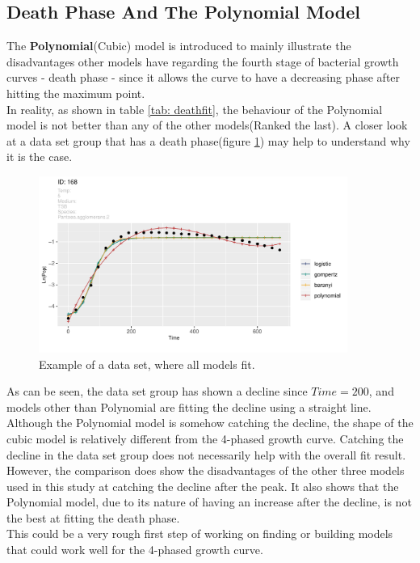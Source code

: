 \documentclass[11pt]{article}
\begin{document}
\subsection{Death Phase And The Polynomial Model}
The \textbf{Polynomial}(Cubic) model is introduced to mainly illustrate the disadvantages other models have regarding the fourth stage of bacterial growth curves - death phase - since it allows the curve to have a decreasing phase after hitting the maximum point.\\
In reality, as shown in table \ref{tab: deathfit}, the behaviour of the Polynomial model is not better than any of the other models(Ranked the last). A closer look at a data set group that has a death phase(figure \ref{fig:deathphasedata}) may help to understand why it is the case.
\FloatBarrier
\begin{figure}[!htbp]
    \centering
    \includegraphics[width=0.9\textwidth]{../Results/allPlots/168.pdf}
    \caption{Example of a data set, where all models fit.}
    \label{fig:deathphasedata}
\end{figure}
\FloatBarrier
As can be seen, the data set group has shown a decline since $Time=200$, and models other than Polynomial are fitting the decline using a straight line. Although the Polynomial model is somehow catching the decline, the shape of the cubic model is relatively different from the 4-phased growth curve. Catching the decline in the data set group does not necessarily help with the overall fit result.\\
However, the comparison does show the disadvantages of the other three models used in this study at catching the decline after the peak. It also shows that the Polynomial model, due to its nature of having an increase after the decline, is not the best at fitting the death phase.\\
This could be a very rough first step of working on finding or building models that could work well for the 4-phased growth curve.
\end{document}
